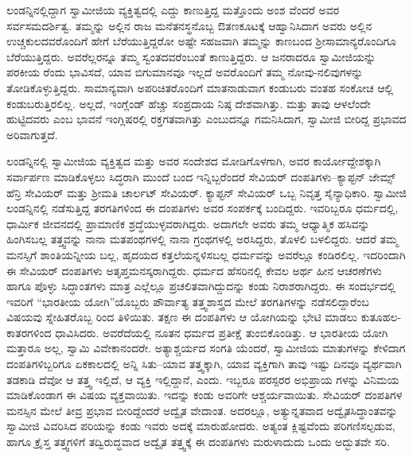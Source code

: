 ಲಂಡನ್ನಿನಲ್ಲಿದ್ದಾಗ ಸ್ವಾಮೀಜಿಯ ವ್ಯಕ್ತಿತ್ವದಲ್ಲಿ ಎದ್ದು ಕಾಣುತ್ತಿದ್ದ ಮತ್ತೊಂದು ಅಂಶ ವೆಂದರೆ ಅವರ ಸರ್ವಸಮದರ್ಶಿತ್ವ. ತಮ್ಮನ್ನು ಅಲ್ಲಿನ ರಾಜ ಮನೆತನಸ್ಥನೊಬ್ಬ ಔತಣಕೂಟಕ್ಕೆ ಆಹ್ವಾನಿಸಿದಾಗ ಅವರು ಅಲ್ಲಿನ ಉಚ್ಚಕುಲದವರೊಂದಿಗೆ ಹೇಗೆ ಬೆರೆಯುತ್ತಿದ್ದರೋ ಅಷ್ಟೇ ಸಹಜವಾಗಿ ತಮ್ಮನ್ನು ಕಾಣಬಂದ ಶ್ರೀಸಾಮಾನ್ಯರೊಂದಿಗೂ ಬೆರೆಯುತ್ತಿದ್ದರು. ಅವರೆಲ್ಲರನ್ನೂ ತಮ್ಮ ಸ್ವಂತದವರೆಂಬಂತೆ ಕಾಣುತ್ತಿದ್ದರು. ಆ ಜನರಾದರೂ ಸ್ವಾಮೀಜಿಯನ್ನು ಪರಕೀಯ ರೆಂದು ಭಾವಿಸದೆ, ಯಾವ ಬಿಗುಮಾನವೂ ಇಲ್ಲದೆ ಅವರೊಂದಿಗೆ ತಮ್ಮ ನೋವು-ನಲಿವುಗಳನ್ನು ತೋಡಿಕೊಳ್ಳುತ್ತಿದ್ದರು. ಸಾಮಾನ್ಯವಾಗಿ ಅಪರಿಚಿತರೊಂದಿಗೆ ಮಾತನಾಡುವಾಗ ಕಂಡುಬರು ವಂತಹ ಸಂಕೋಚ ಆಲ್ಲಿ ಕಂಡುಬರುತ್ತಿರಲಿಲ್ಲ. ಅಲ್ಲದೆ, ಇಂಗ್ಲೆಂಡ್ ಹೆಚ್ಚು ಸಂಪ್ರದಾಯ ನಿಷ್ಠ ದೇಶವಾಗಿತ್ತು. ಮತ್ತು ತಾವು ಆಳಲೆಂದೇ ಹುಟ್ಟಿದವರು ಎಂಬ ಭಾವನೆ ಇಂಗ್ಲಿಷರಲ್ಲಿ ರಕ್ತಗತವಾಗಿತ್ತು ಎಂಬುದನ್ನೂ ಗಮನಿಸಿದಾಗ, ಸ್ವಾಮೀಜಿ ಬೀರಿದ್ದ ಪ್ರಭಾವದ ಅರಿವಾಗುತ್ತದೆ.

ಲಂಡನ್ನಿನಲ್ಲಿ ಸ್ವಾಮೀಜಿಯ ವ್ಯಕ್ತಿತ್ವದ ಮತ್ತು ಅವರ ಸಂದೇಶದ ಮೋಡಿಗೊಳಗಾಗಿ, ಅವರ ಕಾರ್ಯೋದ್ದೇಶಕ್ಕಾಗಿ ಸರ್ವಾರ್ಪಣ ಮಾಡಿಕೊಳ್ಳಲು ಸಿದ್ಧರಾಗಿ ಮುಂದೆ ಬಂದ ಇನ್ನಿಬ್ಬರೆಂದರೆ ಸೇವಿಯರ್ ದಂಪತಿಗಳು–ಕ್ಯಾಪ್ಟನ್ ಜೇಮ್ಸ್ ಹೆನ್ರಿ ಸೇವಿಯರ್ ಮತ್ತು ಶ್ರೀಮತಿ ಚಾರ್ಲಟ್ ಸೇವಿಯರ್. ಕ್ಯಾಪ್ಟನ್ ಸೇವಿಯರ್ ಒಬ್ಬ ನಿವೃತ್ತ ಸೈನ್ಯಾಧಿಕಾರಿ. ಸ್ವಾಮೀಜಿ ಲಂಡನ್ನಿನಲ್ಲಿ ನಡೆಸುತ್ತಿದ್ದ ತರಗತಿಗಳಿಂದ ಈ ದಂಪತಿಗಳು ಅವರ ಸಂಪರ್ಕಕ್ಕೆ ಬಂದಿದ್ದರು. ಇವರಿಬ್ಬರೂ ಧರ್ಮದಲ್ಲಿ, ಧಾರ್ಮಿಕ ಜೀವನದಲ್ಲಿ ಪ್ರಾಮಾಣಿಕ ಶ್ರದ್ಧೆಯುಳ್ಳವರಾಗಿದ್ದರು. ಅದಾಗಲೇ ಅವರು ತಮ್ಮ ಆಧ್ಯಾತ್ಮಿಕ ಹಸಿವನ್ನು ಹಿಂಗಿಸಬಲ್ಲ ತತ್ತ್ವವನ್ನು ನಾನಾ ಮತಪಂಥಗಳಲ್ಲಿ ನಾನಾ ಗ್ರಂಥಗಳಲ್ಲಿ ಅರಸಿದ್ದರು, ತೊಳಲಿ ಬಳಲಿದ್ದರು. ಆದರೆ ತಮ್ಮ ಮನಸ್ಸಿಗೆ ಶಾಂತಿಯನ್ನೀಯ ಬಲ್ಲ, ಹೃದಯದ ಕತ್ತಲೆಯನ್ನಳಿಸಬಲ್ಲ ಧರ್ಮವನ್ನು ಅವರೆಲ್ಲೂ ಕಂಡಿರಲಿಲ್ಲ. ಇದರಿಂದಾಗಿ ಈ ಸೇವಿಯರ್ ದಂಪತಿಗಳು ಅತೃಪ್ತಮನಸ್ಕರಾಗಿದ್ದರು. ಧರ್ಮದ ಹೆಸರಿನಲ್ಲಿ ಕೇವಲ ಅರ್ಥ ಹೀನ ಆಚರಣೆಗಳು ಹಾಗೂ ಪೊಳ್ಳು ಸಿದ್ಧಾಂತಗಳು ಮಾತ್ರ ಎಲ್ಲೆಲ್ಲೂ ಪ್ರಚಲಿತವಾಗಿದ್ದುದನ್ನು ಕಂಡು ನಿರಾಶರಾಗಿದ್ದರು. ಈ ಸಂದರ್ಭದಲ್ಲಿ ಇವರಿಗೆ “ಭಾರತೀಯ ಯೋಗಿ”ಯೊಬ್ಬರು ಪೌರ್ವಾತ್ಯ ತತ್ತ್ವಶಾಸ್ತ್ರದ ಮೇಲೆ ತರಗತಿಗಳನ್ನು ನಡೆಸಲಿದ್ದಾರೆಂಬ ವಿಷಯವು ಸ್ನೇಹಿತರೊಬ್ಬ ರಿಂದ ತಿಳಿಯಿತು. ತಕ್ಷಣ ಈ ದಂಪತಿಗಳು ಆ ಯೋಗಿಯನ್ನು ಭೇಟಿ ಮಾಡಲು ಕುತೂಹಲ- ಕಾತರಗಳಿಂದ ಧಾವಿಸಿದರು. ಅವರೆದೆಯಲ್ಲಿ ನೂತನ ಧರ್ಮದ ಪ್ರತೀಕ್ಷೆ ತುಂಬಿಕೊಂಡಿತ್ತು. ಆ ಭಾರತೀಯ ಯೋಗಿ ಮತ್ತಾರೂ ಅಲ್ಲ, ಸ್ವಾಮಿ ವಿವೇಕಾನಂದರೇ. ಅತ್ಯಾಶ್ಚರ್ಯದ ಸಂಗತಿ ಯೆಂದರೆ, ಸ್ವಾಮೀಜಿಯ ಮಾತುಗಳನ್ನು ಕೇಳಿದಾಗ ದಂಪತಿಗಳಿಬ್ಬರಿಗೂ ಏಕಕಾಲದಲ್ಲಿ ಅನ್ನಿ ಸಿತು–ಯಾವ ತತ್ತ್ವಕ್ಕಾಗಿ, ಯಾವ ವ್ಯಕ್ತಿಗಾಗಿ ತಾವು ಇಷ್ಟು ದಿನವೂ ವ್ಯರ್ಥವಾಗಿ ತಡಕಾಡಿ ದೆವೋ ಆ ತತ್ತ್ವ ಇಲ್ಲಿದೆ, ಆ ವ್ಯಕ್ತಿ ಇಲ್ಲಿದ್ದಾನೆ, ಎಂದು. ಇಬ್ಬರೂ ಪರಸ್ಪರರ ಅಭಿಪ್ರಾಯ ಗಳನ್ನು ವಿನಿಮಯ ಮಾಡಿಕೊಂಡಾಗ ಈ ವಿಷಯ ವ್ಯಕ್ತವಾಯಿತು. ಇದನ್ನು ಕಂಡು ಅವರಿಗೇ ಆಶ್ಚರ್ಯವಾಯಿತು. ಸೇವಿಯರ್ ದಂಪತಿಗಳ ಮನಸ್ಸಿನ ಮೇಲೆ ತೀವ್ರ ಪ್ರಭಾವ ಬೀರಿದ್ದೆಂದರೆ ಅದ್ವೈತ ವೇದಾಂತ. ಅದರಲ್ಲೂ, ಅತ್ಯುನ್ನತವಾದ ಅದ್ವೈತಸಿದ್ಧಾಂತವನ್ನು ಸ್ವಾಮೀಜಿ ವಿವರಿಸಿದ ಪರಿಯನ್ನು ಕಂಡು ಇವರು ಅದಕ್ಕೆ ಮಾರುಹೋದರು. ಅತ್ಯಂತ ಕ್ಲಿಷ್ಟವೆಂದು ಪರಿಗಣಿಸಲ್ಪಡುವ, ಹಾಗೂ ಕ್ರೈಸ್ತ ತತ್ತ್ವಗಳಿಗೆ ತದ್ವಿರುದ್ಧವಾದ ಅದ್ವೈತ ತತ್ತ್ವಕ್ಕೆ ಈ ದಂಪತಿಗಳು ಮರುಳಾದುದು ಒಂದು ಅದ್ಭುತವೇ ಸರಿ.

